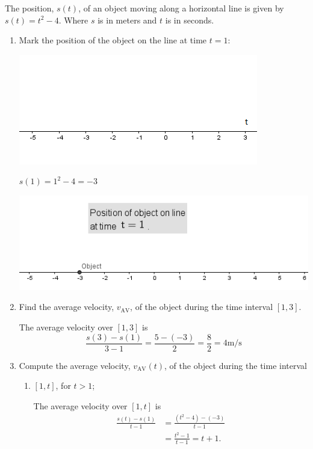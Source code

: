 \documentclass[nooutcomes]{ximera}
\begin{document}
	
\begin{problem} 
The position, $s(t)$, of an object moving along a horizontal line is given by $s(t) = t^2 - 4$.  Where $s$ is in meters and $t$ is in seconds.
\begin{enumerate}
\item
Mark the position of the object on the line at time $t = 1$:
\begin{image}
\includegraphics[scale = 1]{Figure9.png}
\end{image} 

\begin{freeResponse}
$s(1)=1^2-4=-3$
\begin{image}
\includegraphics[scale = .8]{Figure8.png}
\end{image}
\end{freeResponse}


\item
Find the average velocity, $v_{\mathrm{AV}}$, of the object during the time interval $[1, 3]$.
\begin{freeResponse}
The average velocity over $[1, 3]$ is
\[
\frac{s(3) - s(1)}{3-1} = \frac{5 - (-3)}{2} = \frac{8}{2} = 4 \text{m/s}
\]
\end{freeResponse}


\item
Compute the average velocity, $v_{\mathrm{AV}}(t)$, of the object during the time interval
\begin{enumerate}
\item
$[1, t]$, for $t > 1$;
\begin{freeResponse}
The average velocity over $[1, t]$ is
\begin{align*}
\frac{s(t) - s(1)}{t-1} &= \frac{(t^2-4) - (-3)}{t-1}\\
&= \frac{t^2-1}{t-1} = t+1.
\end{align*}
\end{freeResponse}


\end{enumerate}
\end{enumerate}
\end{problem}
\end{document}
